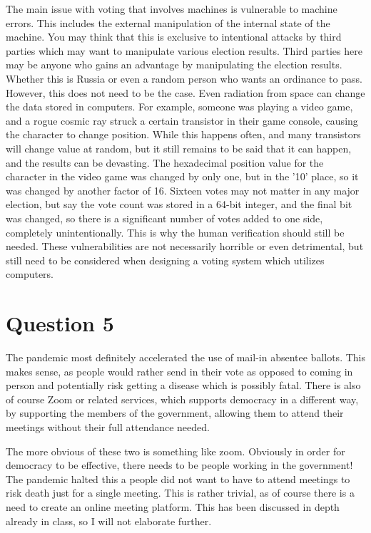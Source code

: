 \documentclass[12pt]{article}
\begin{document}
The main issue with voting that involves machines is vulnerable to machine errors. This includes the external manipulation of the internal state of the machine. You may think that this is exclusive to intentional attacks by third parties which may want to manipulate various election results. Third parties here may be anyone who gains an advantage by manipulating the election results. Whether this is Russia or even a random person who wants an ordinance to pass. However, this does not need to be the case. Even radiation from space can change the data stored in computers. For example, someone was playing a video game, and a rogue cosmic ray struck a certain transistor in their game console, causing the character to change position. While this happens often, and many transistors will change value at random, but it still remains to be said that it can happen, and the results can be devasting. The hexadecimal position value for the character in the video game was changed by only one, but in the '10' place, so it was changed by another factor of 16. Sixteen votes may not matter in any major election, but say the vote count was stored in a 64-bit integer, and the final bit was changed, so there is a significant number of votes added to one side, completely unintentionally. This is why the human verification should still be needed. These vulnerabilities are not necessarily horrible or even detrimental, but still need to be considered when designing a voting system which utilizes computers.

\section*{Question 5}
The pandemic most definitely accelerated the use of mail-in absentee ballots. This makes sense, as people would rather send in their vote as opposed to coming in person and potentially risk getting a disease which is possibly fatal. There is also of course Zoom or related services, which supports democracy in a different way, by supporting the members of the government, allowing them to attend their meetings without their full attendance needed.

The more obvious of these two is something like zoom. Obviously in order for democracy to be effective, there needs to be people working in the government! The pandemic halted this a people did not want to have to attend meetings to risk death just for a single meeting. This is rather trivial, as of course there is a need to create an online meeting platform. This has been discussed in depth already in class, so I will not elaborate further.
\end{document}
